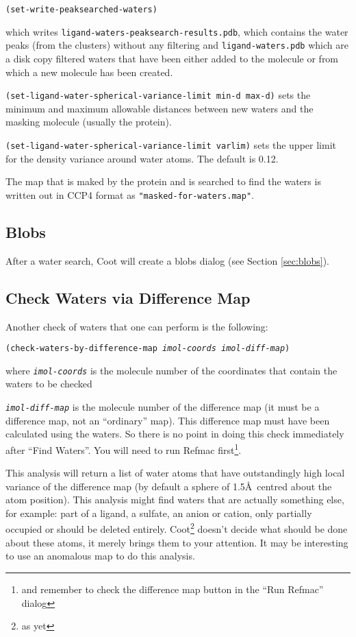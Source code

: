 \documentclass{book}
\begin{document}
\texttt{(set-write-peaksearched-waters)} 

which writes \texttt{ligand-waters-peaksearch-results.pdb}, which
contains the water peaks (from the clusters) without any filtering and
\texttt{ligand-waters.pdb} which are a disk copy filtered waters that
have been either added to the molecule or from which a new molecule
has been created.

\texttt{(set-ligand-water-spherical-variance-limit min-d max-d)} sets
the minimum and maximum allowable distances between new waters and the
masking molecule (usually the protein).

\texttt{(set-ligand-water-spherical-variance-limit varlim)} sets the
upper limit for the density variance around water atoms. The default
is 0.12.

The map that is maked by the protein and is searched to find the
waters is written out in CCP4 format as \texttt{"masked-for-waters.map"}.

\subsection{Blobs}
After a water search, Coot will create a blobs dialog (see Section
\ref{sec:blobs}).

\subsection{Check Waters via Difference Map}
Another check of waters that one can perform is the following:

\texttt{(check-waters-by-difference-map \emph{imol-coords}
  \emph{imol-diff-map})}

where \texttt{\emph{imol-coords}} is the molecule number of the
coordinates that contain the waters to be checked

\texttt{\emph{imol-diff-map}} is the molecule number of the difference
map (it must be a difference map, not an ``ordinary'' map).  This
difference map must have been calculated using the waters. So there is
no point in doing this check immediately after ``Find Waters''.  You
will need to run Refmac first\footnote{and remember to check the
  difference map button in the ``Run Refmac'' dialog}.

This analysis will return a list of water atoms that have
outstandingly high local variance of the difference map (by default a
sphere of 1.5\AA\ centred about the atom position).  This analysis
might find waters that are actually something else, for example: part
of a ligand, a sulfate, an anion or cation, only partially occupied or
should be deleted entirely.  Coot\footnote{as yet} doesn't decide what
should be done about these atoms, it merely brings them to your
attention.  It may be interesting to use an anomalous map to do this
analysis.
\end{document}
